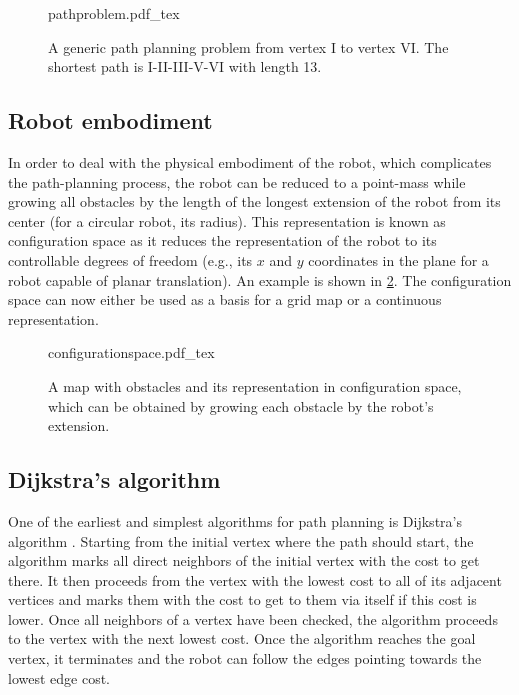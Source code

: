 \begin{figure}[!htb]
    \centering
    \def\svgwidth{0.6\textwidth}
    {pathproblem.pdf_tex}
    \caption{A generic path planning problem from vertex I to vertex VI. The shortest path is I-II-III-V-VI with length 13. \label{fig:pathproblem}}
\end{figure}

\subsection{Robot embodiment}
In order to deal with the physical embodiment of the robot, which complicates the path-planning process, the robot can be reduced to a point-mass while growing all obstacles by the length of the longest extension of the robot from its center (for a circular robot, its radius). This representation is known as configuration space as it reduces the representation of the robot to its controllable degrees of freedom (e.g., its $x$ and $y$ coordinates in the plane for a robot capable of planar translation). An example is shown in \cref{fig:cspace}. The configuration space can now either be used as a basis for a grid map or a continuous representation.

\begin{figure}[!htb]
    \centering
    \def\svgwidth{0.9\textwidth}
    {configurationspace.pdf_tex}
    \caption{A map with obstacles and its representation in configuration space, which can be obtained by growing each obstacle by the robot's extension. \label{fig:cspace}}
\end{figure}

\subsection{Dijkstra's algorithm}

One of the earliest and simplest algorithms for path planning is Dijkstra's algorithm \cite{dijkstra1959note}. Starting from the initial vertex where the path should start, the algorithm marks all direct neighbors of the initial vertex with the cost to get there. It then proceeds from the vertex with the lowest cost to all of its adjacent vertices and marks them with the cost to get to them via itself if this cost is lower. Once all neighbors of a vertex have been checked, the algorithm proceeds to the vertex with the next lowest cost. Once the algorithm reaches the goal vertex, it terminates and the robot can follow the edges pointing towards the lowest edge cost.

